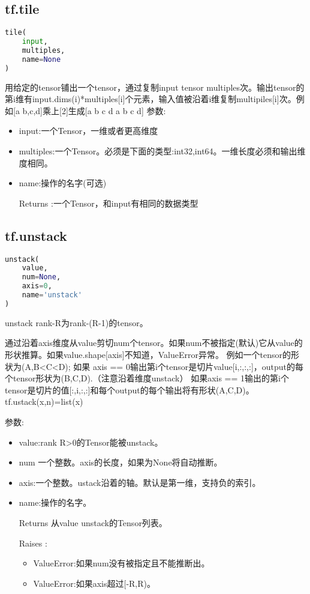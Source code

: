 \subsection{tf.tile}
\begin{lstlisting}[language=Python]
tile(
    input,
    multiples,
    name=None
)
\end{lstlisting}
用给定的tensor铺出一个tensor，通过复制input tensor multiples次。输出tensor的第i维有input.dims(i)*multiples[i]个元素，输入值被沿着i维复制multipiles[i]次。例如[a b,c,d]乘上[2]生成[a b c d a b c d]
参数:
\begin{itemize}
\item input:一个Tensor，一维或者更高维度
\item multiples:一个Tensor。必须是下面的类型:int32,int64。一维长度必须和输出维度相同。
\item name:操作的名字(可选)
\item[Returns]:一个Tensor，和input有相同的数据类型
\end{itemize}

\subsection{tf.unstack}
\begin{lstlisting}[language=Python]
unstack(
    value,
    num=None,
    axis=0,
    name='unstack'
)
\end{lstlisting}
unstack rank-R为rank-(R-1)的tensor。

通过沿着axis维度从value剪切num个tensor。如果num不被指定(默认)它从value的形状推算。如果value.shape[axis]不知道，ValueError异常。
例如一个tensor的形状为(A,B<C<D);
如果 axis == 0输出第i个tensor是切片value[i,:,:,:]，output的每个tensor形状为(B,C,D).（注意沿着维度unstack）
如果axis == 1输出的第i个tensor是切片的值[:,i,:,:]和每个output的每个输出将有形状(A,C,D)。
tf.ustack(x,n)=list(x)

参数:
\begin{itemize}
\item value:rank R>0的Tensor能被unstack。
\item num 一个整数。axis的长度，如果为None将自动推断。
\item axis:一个整数。ustack沿着的轴。默认是第一维，支持负的索引。
\item name:操作的名字。
\item[Returns] 从value unstack的Tensor列表。
\item[Raises]:
\begin{itemize}
\item ValueError:如果num没有被指定且不能推断出。
\item ValueError:如果axis超过[-R,R)。
\end{itemize}
\end{itemize}
